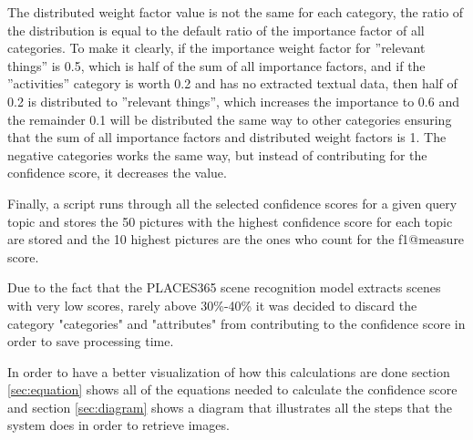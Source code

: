     The distributed weight factor value is not the same for each category, the ratio of the distribution is equal to the default ratio of the importance factor of all categories. To make it clearly, if the importance weight factor for ”relevant things” is 0.5, which is half of the sum of all importance factors, and if the ”activities” category is worth 0.2 and has no extracted textual data, then half of 0.2 is distributed to ”relevant things”, which increases the importance to 0.6 and the remainder 0.1 will be distributed the same way to other categories ensuring that the sum of all importance factors and distributed weight factors is 1. The negative categories works the same way, but instead of contributing for the confidence score, it decreases the value.

    Finally, a script runs through all the selected confidence scores for a given
    query topic and stores the 50 pictures with the highest confidence score for each topic are stored and the 10 highest pictures are the ones who count for the f1@measure score.
       

    Due to the fact that the PLACES365 scene recognition model extracts scenes with very low scores, rarely above 30\%-40\% it was decided to discard the category "categories" and "attributes" from contributing to the confidence score in order to save processing time.


    In order to have a better visualization of how this calculations are done section \ref{sec:equation} shows all of the equations needed to calculate the confidence score and section \ref{sec:diagram} shows a diagram that illustrates all the steps that the system does in order to retrieve images.

  
\newpage

